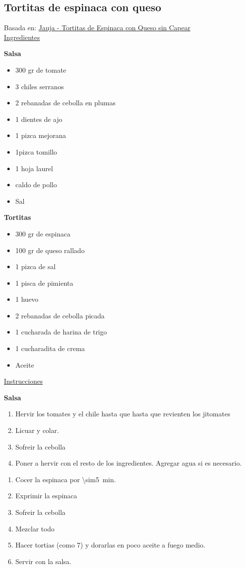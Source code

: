 \subsection{Tortitas de espinaca con queso}

Basada en: \href{https://www.youtube.com/watch?v=r7K9CjKKr6k}{Jauja - Tortitas de Espinaca con Queso sin Capear}\\

\underline{Ingredientes}

\textbf{Salsa}
\begin{itemize}
\item 300 gr de tomate
\item 3 chiles serranos
\item 2 rebanadas de cebolla en plumas
\item 1 dientes de ajo
\item 1 pizca mejorana
\item 1pizca tomillo
\item 1 hoja laurel
\item caldo de pollo
\item Sal
\end{itemize}

\textbf{Tortitas}
\begin{itemize}
\item 300 gr de espinaca
\item 100 gr de queso rallado
\item 1 pizca de sal
\item 1 pisca de pimienta
\item 1 huevo
\item 2 rebanadas de cebolla picada
\item 1 cucharada de harina de trigo
\item 1 cucharadita de crema
\item Aceite
\end{itemize}

\underline{Instrucciones}

\textbf{Salsa}
\begin{enumerate}
\item Hervir los tomates y el chile hasta que hasta que revienten los jitomates
\item Licuar y colar.
\item Sofreir la cebolla
\item Poner a hervir con el resto de los ingredientes. Agregar agua si es necesario.
\end{enumerate}

\begin{enumerate}
\item Cocer la espinaca por \SI{\sim5}{min}.
\item Exprimir la espinaca
\item Sofreir la cebolla
\item Mezclar todo
\item Hacer tortias (como 7) y dorarlas en poco aceite a fuego medio.
\item Servir con la salsa.
\end{enumerate}